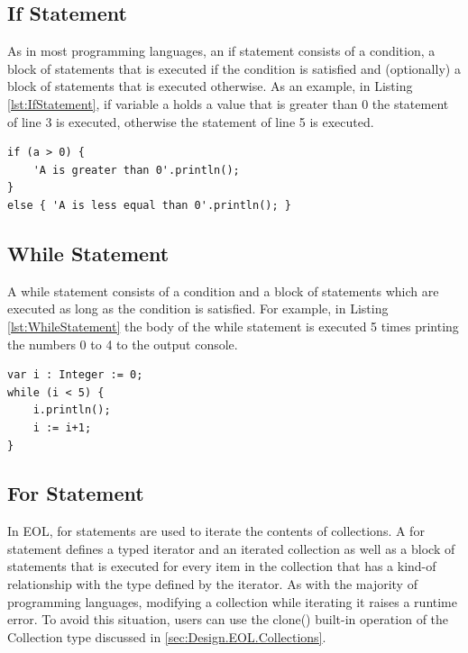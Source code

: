 \subsection{If Statement}

As in most programming languages, an if statement consists of a condition, a block of statements that is executed if the condition is satisfied and (optionally) a block of statements that is executed otherwise. As an example, in Listing \ref{lst:IfStatement}, if variable a holds a value that is greater than 0 the statement of line 3 is executed, otherwise the statement of line 5 is executed.

\begin{lstlisting}[basicstyle=\ttfamily\footnotesize, flexiblecolumns=true, numbers=none, nolol=true, caption=Example illustrating an if statement, label=lst:IfStatement, numbers=left, language=EOL, tabsize=2]
if (a > 0) {
	'A is greater than 0'.println();
}
else { 'A is less equal than 0'.println(); }
\end{lstlisting}

\subsection{While Statement}

A while statement consists of a condition and a block of statements which are executed as long as the condition is satisfied. For example, in Listing \ref{lst:WhileStatement} the body of the while statement is executed 5 times printing the numbers 0 to 4 to the output console.

\begin{lstlisting}[basicstyle=\ttfamily\footnotesize, flexiblecolumns=true, numbers=none, nolol=true, caption=Example of a while statement, label=lst:WhileStatement, numbers=left, language=EOL, tabsize=2]
var i : Integer := 0;
while (i < 5) {
	i.println();
	i := i+1;
}
\end{lstlisting}

\subsection{For Statement}

In EOL, for statements are used to iterate the contents of collections. A for statement defines a typed iterator and an iterated collection as well as a block of statements that is executed for every item in the collection that has a kind-of relationship with the type defined by the iterator. As with the majority of programming languages, modifying a collection while iterating it raises a runtime error. To avoid this situation, users can use the clone() built-in operation of the Collection type discussed in \ref{sec:Design.EOL.Collections}.

